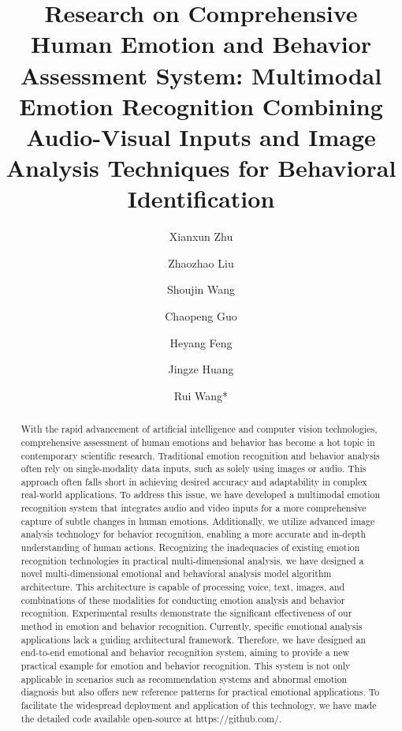 \documentclass[preprint,12pt]{elsarticle}
\begin{document}
\begin{frontmatter}


\title{Research on Comprehensive Human Emotion and Behavior Assessment System: Multimodal Emotion Recognition Combining Audio-Visual Inputs and Image Analysis Techniques for Behavioral Identification}


\author[a]{Xianxun Zhu}
\author[a]{Zhaozhao Liu}
\author[b]{Shoujin Wang}
\author[a]{Chaopeng Guo}
\author[a]{Heyang Feng}
\author[a]{Jingze Huang}
\author[a]{Rui Wang*}

\begin{abstract}
With the rapid advancement of artificial intelligence and computer vision technologies, comprehensive assessment of human emotions and behavior has become a hot topic in contemporary scientific research. Traditional emotion recognition and behavior analysis often rely on single-modality data inputs, such as solely using images or audio. This approach often falls short in achieving desired accuracy and adaptability in complex real-world applications. To address this issue, we have developed a multimodal emotion recognition system that integrates audio and video inputs for a more comprehensive capture of subtle changes in human emotions. Additionally, we utilize advanced image analysis technology for behavior recognition, enabling a more accurate and in-depth understanding of human actions. Recognizing the inadequacies of existing emotion recognition technologies in practical multi-dimensional analysis, we have designed a novel multi-dimensional emotional and behavioral analysis model algorithm architecture. This architecture is capable of processing voice, text, images, and combinations of these modalities for conducting emotion analysis and behavior recognition. Experimental results demonstrate the significant effectiveness of our method in emotion and behavior recognition. Currently, specific emotional analysis applications lack a guiding architectural framework. Therefore, we have designed an end-to-end emotional and behavior recognition system, aiming to provide a new practical example for emotion and behavior recognition. This system is not only applicable in scenarios such as recommendation systems and abnormal emotion diagnosis but also offers new reference patterns for practical emotional applications. To facilitate the widespread deployment and application of this technology, we have made the detailed code available open-source at https://github.com/.


\end{abstract}
\end{frontmatter}
\end{document}
